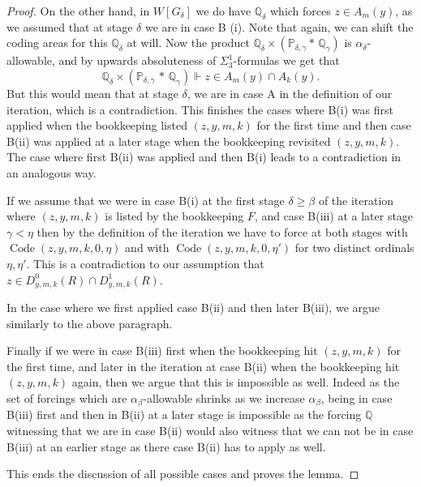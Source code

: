 \documentclass[a4paper,11pt]{article}
\newcommand{\forceP}{\mathbb{P}}
\newcommand{\forceQ}{\mathbb{Q}}
\begin{document}
\begin{proof}
On the other hand, in $W[G_{\delta}]$ we do have $\forceQ_{\delta}$ which forces $z \in A_m(y)$, as we assumed that at stage $\delta$ we are in case B (i). Note that again, we can shift the coding areas for this $\forceQ_{\delta}$ at will. 
Now the product $\forceQ_{\delta} \times (\forceP_{\delta, \gamma} \ast \, \forceQ_{\gamma})$ is $\alpha_{\delta}$-allowable, and by upwards absoluteness of $\Sigma^1_3$-formulas we get that 
\[ \forceQ_{\delta} \times (\forceP_{\delta,\gamma} \, \ast \, \forceQ_{\gamma}) \Vdash z \in A_m(y) \cap A_k(y). \]
But this would mean that at stage $\delta$, we are in case A in the definition of our iteration, which is a contradiction. This finishes the cases where B(i) was first applied when the bookkeeping listed $(z,y,m,k)$ for the first time and then case B(ii) was applied at a later stage when the bookkeeping revisited $(z,y,m,k)$. The case where first B(ii) was applied and then B(i) leads to a contradiction in an analogous way.

If we assume that we were in case B(i) at the first stage $\delta \ge \beta$ of the iteration where $(z,y,m,k)$ is listed by the bookkeeping $F$, and case B(iii) at a later stage $\gamma < \eta$ then by the definition of the iteration we have to force at both stages with $\operatorname{Code} (z,y,m,k,0,\eta)$ and with $\operatorname{Code} (z,y,m,k,0,\eta')$ for two distinct ordinals $\eta,\eta'$. This is a contradiction to our assumption that $z \in  D^0_{y,m,k}(R) \cap D^1_{y,m,k}(R)$.

In the case where we first applied case B(ii) and then later B(iii), we argue similarly to the above paragraph.

Finally if we were in case B(iii) first when the bookkeeping hit $(z,y,m,k)$ for the first time, and later in the iteration at case B(ii) when the bookkeeping hit $(z,y,m,k)$ again, then we argue that this is impossible as well. Indeed as the set of forcings which are $\alpha_{\beta}$-allowable shrinks as we increase $\alpha_{\beta}$, being in case B(iii) first and then in B(ii) at a later stage is impossible as the forcing $\forceQ$ witnessing that we are in case B(ii) would also witness that we can not be in case B(iii) at an earlier stage as there case B(ii) has to apply as well.

This ends the discussion of all possible cases and proves the lemma.

\end{proof}
\end{document}
